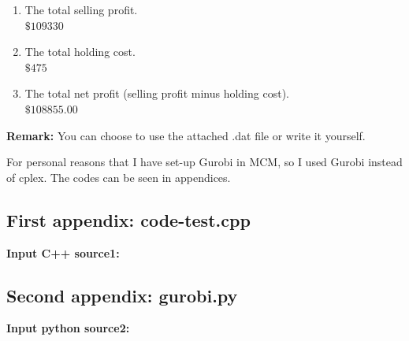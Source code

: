 \documentclass[12pt,a4paper]{article}
\makeatletter
\newtheorem*{solution}{Solution}
\theoremstyle{definition}
\renewenvironment{solution}[1][Solution] {\par\pushQED{\qed}\normalfont\topsep6\p@\@plus6\p@\relax\trivlist\item[\hskip\labelsep\bfseries#1\@addpunct{.}]\ignorespaces}{\popQED\endtrivlist\@endpefalse} \makeatother
\makeatother
\begin{document}
\begin{enumerate}
\begin{enumerate}
\begin{enumerate}
\begin{enumerate}
\begin{table}[htbp]
\begin{tabular}
      \hline
      \end{tabular}
    \end{table}
    
    
    
    \end{enumerate}
    \item
    The total selling profit.\\
    $\$109330$
    \item
    The total holding cost.\\
    $\$475$
    
    \item
    The total net profit (selling profit minus holding cost).\\
    $\$108855.00$
    
    \end{enumerate}
    \end{enumerate}
    \textbf{Remark:} You can choose to use the attached .dat file or write it yourself. 

\end{enumerate}

\begin{solution}
For personal reasons that I have set-up Gurobi in MCM, so I used Gurobi instead of cplex. The codes can be seen in appendices.

\end{solution}

\newpage

\begin{appendices}
\section{First appendix: code-test.cpp}
\textcolor[rgb]{0.98,0.00,0.00}{\textbf{Input C++ source1:}}




%

\end{appendices}

\newpage

\begin{appendices}
\section{Second appendix: gurobi.py}
\textcolor[rgb]{0.98,0.00,0.00}{\textbf{Input python source2:}}


\end{appendices}
\end{document}
